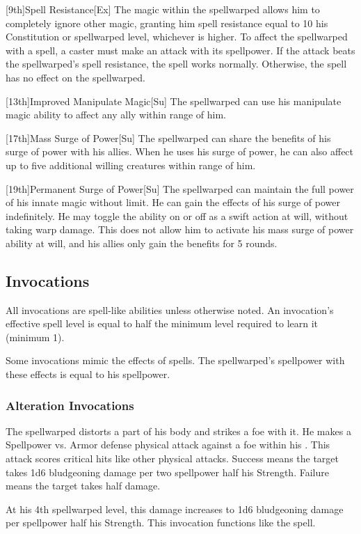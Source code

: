         [9th]{Spell Resistance}[Ex]
        The magic within the spellwarped allows him to completely ignore other magic, granting him spell resistance equal to 10 \add his Constitution or spellwarped level, whichever is higher.
        To affect the spellwarped with a spell, a caster must make an attack with its spellpower.
        If the attack beats the spellwarped's spell resistance, the spell works normally.
        Otherwise, the spell has no effect on the spellwarped.

        [13th]{Improved Manipulate Magic}[Su]
        The spellwarped can use his manipulate magic ability to affect any ally within \rngmed range of him.

        [17th]{Mass Surge of Power}[Su]
        The spellwarped can share the benefits of his surge of power with his allies.
        When he uses his surge of power, he can also affect up to five additional willing creatures within \rngmed range of him.

        [19th]{Permanent Surge of Power}[Su]
        The spellwarped can maintain the full power of his innate magic without limit.
        He can gain the effects of his surge of power indefinitely.
        He may toggle the ability on or off as a swift action at will, without taking warp damage.
        This does not allow him to activate his mass surge of power ability at will, and his allies only gain the benefits for 5 rounds.

    \subsection{Invocations}\label{Invocations}

        All invocations are spell-like abilities unless otherwise noted.
        An invocation's effective spell level is equal to half the minimum level required to learn it (minimum 1).

        Some invocations mimic the effects of spells.
        The spellwarped's spellpower with these effects is equal to his spellpower.

        \subsubsection{Alteration Invocations}
            The spellwarped distorts a part of his body and strikes a foe with it.
            He makes a Spellpower vs. Armor defense physical attack against a foe within his .
            This attack scores critical hits like other physical attacks.
            Success means the target takes 1d6 bludgeoning damage per two spellpower \add half his Strength.
            Failure means the target takes half damage.
            \par At his 4th spellwarped level, this damage increases to 1d6 bludgeoning damage per spellpower \add half his Strength.
            This invocation functions like the  spell.

